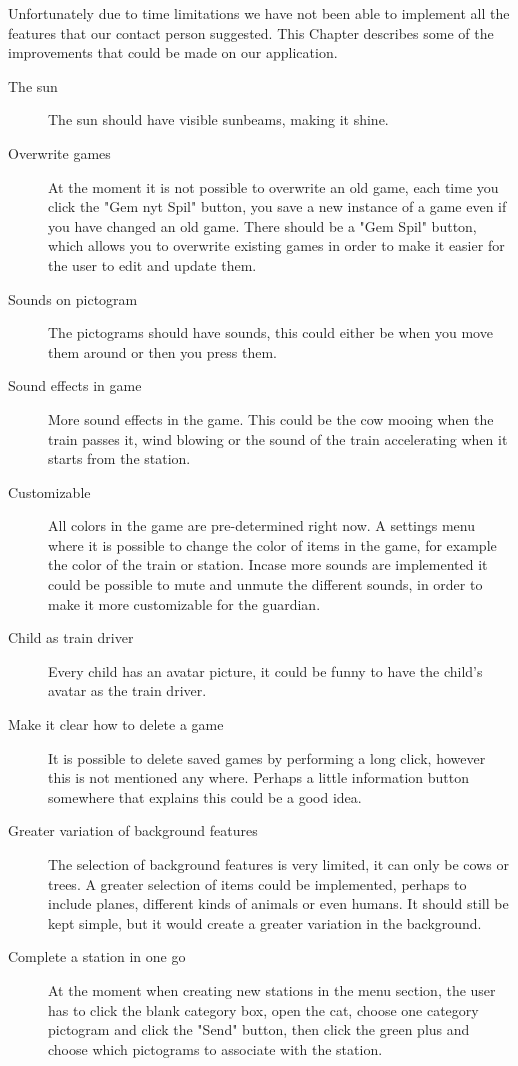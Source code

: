 Unfortunately due to time limitations we have not been able to implement all the features that our contact person suggested. This Chapter describes some of the improvements that could be made on our application.

\begin{description}
\item[The sun] The sun should have visible sunbeams, making it shine. 
\item[Overwrite games] At the moment it is not possible to overwrite an old game, each time you click the "Gem nyt Spil" button, you save a new instance of a game even if you have changed an old game. There should be a "Gem Spil" button, which allows you to overwrite existing games in order to make it easier for the user to edit and update them.
\item[Sounds on pictogram] The pictograms should have sounds, this could either be when you move them around or then you press them. 
\item[Sound effects in game] More sound effects in the game. This could be the cow mooing when the train passes it, wind blowing or the sound of the train accelerating when it starts from the station.
\item[Customizable] All colors in the game are pre-determined right now. A settings menu where it is possible to change the color of items in the game, for example the color of the train or station. Incase more sounds are implemented it could be possible to mute and unmute the different sounds, in order to make it more customizable for the guardian.
\item[Child as train driver] Every child has an avatar picture, it could be funny to have the child's avatar as the train driver. 
\item[Make it clear how to delete a game] It is possible to delete saved games by performing a long click, however this is not mentioned any where. Perhaps a little information button somewhere that explains this could be a good idea. 
\item[Greater variation of background features] The selection of background features is very limited, it can only be cows or trees. A greater selection of items could be implemented, perhaps to include planes, different kinds of animals or even humans. It should still be kept simple, but it would create a greater variation in the background. 
\item[Complete a station in one go] At the moment when creating new stations in the menu section, the user has to click the blank category box, open the \ac{cat}, choose one category pictogram and click the "Send" button, then click the green plus and choose which pictograms to associate with the station.


\end{description}
